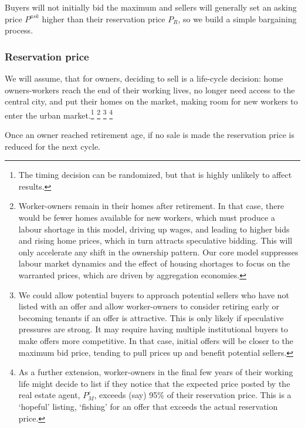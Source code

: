 Buyers will not initially bid the maximum and sellers will generally set an asking price $P^{ask}$ higher than their reservation price $P_R$, so we build a simple bargaining process.



\subsubsection{Reservation price}\label{sssec-reservation-price}

We will assume,  that for owners, deciding to sell is a life-cycle decision: home owners-workers  reach the end of their working lives, no longer need access to the central city, and put their homes on the market, making room for new workers to enter the urban market.\footnote{The timing decision can be randomized, but that is highly unlikely to affect results.} \footnote{Worker-owners remain in their homes after retirement. In that case,  there would be fewer homes available for new workers, which must produce a labour shortage in this model, driving up wages, and leading to higher bids and rising home prices, which in turn attracts  speculative bidding. This will only accelerate any shift in the ownership pattern. Our core model suppresses labour market dynamics and the effect of housing shortages to focus on the warranted prices, which are driven by aggregation economies.} 
\footnote{We could allow potential buyers  to approach potential sellers who have not listed with an offer and allow worker-owners to consider retiring early or becoming tenants if an offer is attractive.  This is only likely if speculative pressures are strong. It may require having multiple institutional buyers to make offers more competitive. In that case, initial offers will be closer to the maximum bid price, tending to pull prices up and benefit potential sellers.}  
\footnote{As a further  extension, worker-owners in the final few years of their working life might decide to  list if  they notice that the expected price posted by the real estate agent, $P_M^e$,  exceeds (say) 95\% of their reservation price. This is a `hopeful' listing, `fishing' for an offer that exceeds the actual reservation price.}


Once an owner reached retirement age, if no sale is made the reservation price is reduced for the next cycle.

